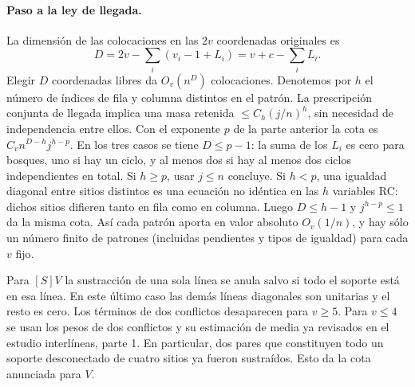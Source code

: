\paragraph{Paso a la ley de llegada.}
La dimensión de las colocaciones en las $2v$ coordenadas originales es
\[
 D=2v-\sum_i(v_i-1+L_i)=v+c-\sum_iL_i .
\]
Elegir $D$ coordenadas libres da $O_v(n^D)$ colocaciones. Denotemos por $h$ el número
de índices de fila y columna distintos en el patrón. La prescripción conjunta de llegada
implica una masa retenida $\le C_h(j/n)^h$, sin necesidad de independencia entre ellos.
Con el exponente $p$ de la parte anterior la cota es $C_v n^{D-h}j^{h-p}$.
En los tres casos se tiene $D\le p-1$: la suma de los $L_i$ es cero para bosques,
uno si hay un ciclo, y al menos dos si hay al menos dos ciclos independientes en total.
Si $h\ge p$, usar $j\le n$ concluye. Si $h<p$, una igualdad diagonal entre sitios
distintos es una ecuación no idéntica en las $h$ variables RC: dichos sitios difieren
tanto en fila como en columna. Luego $D\le h-1$ y $j^{h-p}\le1$ da la misma cota.
Así cada patrón aporta en valor absoluto $O_v(1/n)$, y hay sólo un número finito
de patrones (incluidas pendientes y tipos de igualdad) para cada $v$ fijo.

Para $[S]V$ la sustracción de una sola línea se anula salvo si todo el soporte está
en esa línea. En este último caso las demás líneas diagonales son unitarias y el resto
es cero. Los términos de dos conflictos desaparecen para $v\ge5$. Para $v\le4$ se
usan los pesos de dos conflictos y su estimación de media ya revisados en el estudio
interlíneas, parte 1. En particular, dos pares que constituyen todo un soporte
desconectado de cuatro sitios ya fueron sustraídos. Esto da la cota anunciada para $V$.

